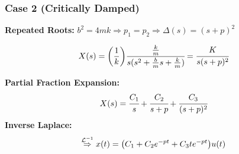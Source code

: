 \documentclass[aspectratio=169]{beamer}
\begin{document}
\begin{frame}
	\frametitle{Case 2 (Critically Damped)}


	\textbf{Repeated Roots:}
	\(
		b^2 = 4mk \Rightarrow p_1 = p_2 
		\Rightarrow \Delta(s) = {(s+p)}^2
	\)

	\pause{}
	\[
		X(s) = \qty(\frac{1}{k}) \cfrac{\frac{k}{m}}{s(s^2 + \frac{b}{m} s + \frac{k}{m})}
		= \cfrac{K}{s (s+p)^2} 
	\]
	\pause{}

	\textbf{Partial Fraction Expansion:} %
	\[
		X(s) = \cfrac{C_1}{s} + \cfrac{C_2}{s+p} + \cfrac{C_3}{(s+p)^2}
	\]
	\pause{}
	\textbf{Inverse Laplace:}
	\[
		\overset{\mathcal{L}^{-1}}{\Rightarrow}
		x(t) = \qty(C_1 + C_2 e^{-pt} + C_3 t e^{-pt}) u(t)	
	\]




\end{frame}
\end{document}
